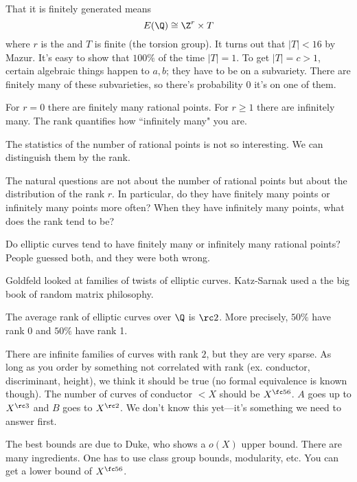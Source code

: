 That it is finitely generated means
\[
E(\Q) \cong \Z^r \times T
\]
where $r$ is the  and $T$ is finite (the torsion group). It turns out that $|T|<16$ by Mazur. %
It's easy to show that $100\%$ of the time $|T|=1$. To get $|T|=c>1$, certain algebraic things happen to $a,b$; they have to be on a subvariety. There are finitely many of these subvarieties, so there's probability 0 it's on one of them.

For $r=0$ there are finitely many rational points. For $r\ge 1$ there are infinitely many. The rank quantifies how ``infinitely many" you are.

The statistics of the number of rational points is not so interesting. We can distinguish them by the rank.

The natural questions are not about the number of rational points but about the distribution of the rank $r$.
In particular, do they have finitely many points or infinitely many points more often? When they have infinitely many points, what does the rank tend to be?

Do elliptic curves tend to have finitely many or infinitely many rational points? People guessed both, and they were both wrong.

Goldfeld looked at families of twists of elliptic curves. Katz-Sarnak used a the big book of random matrix philosophy.
\begin{conj}
The average rank of elliptic curves over $\Q$ is $\rc2$. More precisely, $50\%$ have rank 0 and $50\%$ have rank 1. 
\end{conj}
There are infinite families of curves with rank $2$, but they are very sparse.
As long as you order by something not correlated with rank (ex. conductor, discriminant, height), we think it should be true (no formal equivalence is known though). 
The number of curves of conductor $<X$ should be $X^{\fc 56}$. $A$ goes up to $X^{\rc 3}$ and $B$ goes to $X^{\rc 2}$. %
We don't know this yet---it's something we need to answer first.

The best bounds are due to Duke, who shows a $o(X)$ upper bound. There are many ingredients. One has to use class group bounds, modularity, etc. %
You can get a lower bound of $X^{\fc 56}$. 

